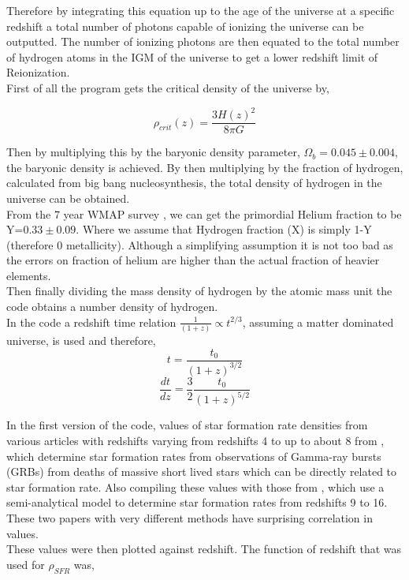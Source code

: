 \documentclass{article}
\begin{document}
Therefore by integrating this equation up to the age of the universe at a specific redshift a total number of photons capable of ionizing the universe can be outputted. The number of ionizing photons are then equated to the total number of hydrogen atoms in the IGM of the universe to get a lower redshift limit of Reionization.\\
First of all the program gets the critical density of the universe by,

\begin{equation}
\rho_{crit}(z)=\frac{3H(z)^{2}}{8\pi G}
\end{equation}

Then by multiplying this by the baryonic density parameter, $\Omega_{b}=0.045\pm0.004$, the baryonic density is achieved. By then multiplying by the fraction of hydrogen, calculated from big bang nucleosynthesis, the total density of hydrogen in the universe can be obtained.\\

From the 7 year WMAP survey \cite{2011ApJS..192...18K}, we can get the primordial Helium fraction to be Y=$0.33\pm0.09$. Where we assume that Hydrogen fraction (X) is simply 1-Y (therefore 0 metallicity). Although a simplifying assumption it is not too bad as the errors on fraction of helium are higher than the actual fraction of heavier elements.\\

Then finally dividing the mass density of hydrogen by the atomic mass unit the code obtains a number density of hydrogen.\\

In the code a redshift time relation $\frac{1}{(1+z)}\propto t^{2/3}$, assuming a matter dominated universe, is used and therefore,
\begin{equation}
t=\frac{t_{0}}{(1+z)^{3/2}}
\end{equation}
\begin{equation}
\frac{dt}{dz}=\frac{3}{2}\frac{t_{0}}{(1+z)^{5/2}}
\end{equation}

In the first version of the code, values of star formation rate densities from  various articles with redshifts varying from redshifts 4 to up to about 8 from \cite{2010MNRAS.401.2561W}, which determine star formation rates from observations of Gamma-ray bursts (GRBs) from deaths of massive short lived stars which can be directly related to star formation rate. Also compiling these values with those from \cite{2012ApJ...759L..38A}, which use a semi-analytical model to determine star formation rates from redshifts 9 to 16. These two papers with very different methods have surprising correlation in values.\\
These values were then plotted against redshift. The function of redshift that was used for $\rho_{SFR}$ was,
\end{document}
